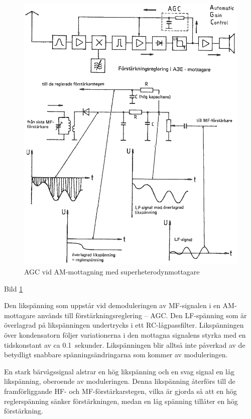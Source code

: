 \begin{figure}
  \includegraphics[width=\textwidth]{images/bild_2_4-20.png}
  \caption{AGC vid AM-mottagning med superheterodynmottagare}
  \label{fig:bildII4-20}
\end{figure}

Bild \ref{fig:bildII4-20}

Den likspänning som uppstår vid demoduleringen av MF-signalen i en
AM-mottagare används till förstärkningsreglering -- AGC. Den
LF-spänning som är överlagrad på likspänningen undertrycks i ett
RC-lågpassfilter. Likspänningen över kondensatorn följer variationerna
i den mottagna signalens styrka med en tidskonstant av ca 0.1~sekunder.
Likspänningen blir alltså inte påverkad av de betydligt snabbare
spänningsändringarna som kommer av moduleringen.

En stark bärvågssignal alstrar en hög likspänning och en svag signal
en låg likspänning, oberoende av moduleringen. Denna likspänning
återförs till de framförliggande HF- och MF-förstärkarstegen, vilka är
gjorda så att en hög reglerspänning sänker förstärkningen, medan en
låg spänning tillåter en hög förstärkning.

